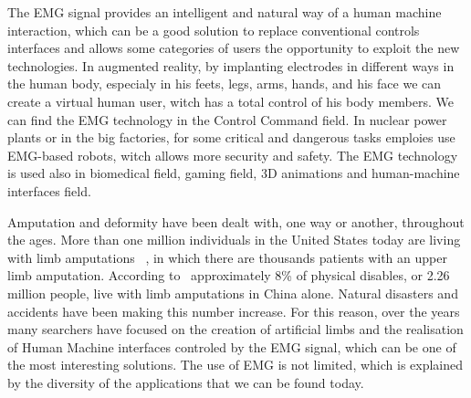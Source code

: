 \documentclass[conference]{IEEEtran}
\begin{document}


The EMG signal provides an intelligent and natural way of a human machine interaction, which can be a good solution to replace conventional controls interfaces and allows some categories of users the opportunity to exploit the new technologies.
In augmented reality, by implanting electrodes in different ways in the human body, especialy in his feets, legs, arms, hands, and his face we can create a virtual human user, witch has a total control of his body members.
We can find the EMG technology in the Control Command field. In nuclear power plants or in the big factories, for some critical and dangerous tasks emploies use EMG-based robots, witch allows more security and safety.
The EMG technology is used also in biomedical field, gaming field, 3D animations and human-machine interfaces field.\par
Amputation and deformity have been dealt with, one way or
another, throughout the ages. More than one million individuals in the United States today are living with limb 
amputations ~\cite{Patricia}, in which there are thousands patients with an upper limb amputation.
According to~\cite{China} approximately 8\% of physical disables, or 2.26 million people,
live with limb amputations in China alone. Natural disasters and accidents have been making this number increase. For this reason, over the years many searchers 
have focused on the creation of artificial limbs and the realisation of Human Machine interfaces controled by the EMG signal, which can be one of the most interesting solutions. 
The use of EMG is not limited, which is explained by the diversity of the applications that we can be found today.
\par
\end{document}
